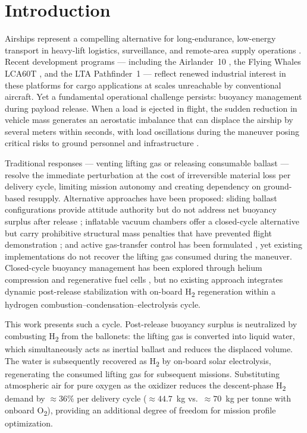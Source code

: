 \documentclass[applsci,article,submit,pdftex,moreauthors]{Definitions/mdpi}
\newcommand{\added}[1]{#1}
\begin{document}
\section{Introduction}

Airships represent a compelling alternative for long-endurance, low-energy transport in
heavy-lift logistics, surveillance, and remote-area supply operations \cite{ref1,ref2}. Recent development
programs --- including the Airlander~10 \cite{ref4}, the Flying Whales LCA60T \cite{ref5}, and the LTA
Pathfinder~1 \cite{ref6} --- reflect renewed industrial interest in these platforms for cargo applications
at scales unreachable by conventional aircraft. Yet a fundamental operational challenge persists:
buoyancy management during payload release. When a load is ejected in flight, the sudden
reduction in vehicle mass generates an aerostatic imbalance that can displace the airship by
several meters within seconds, with load oscillations during the maneuver posing critical risks
to ground personnel and infrastructure \cite{BenAbdallah2019}.

\added{Traditional responses --- venting lifting gas or releasing consumable ballast --- resolve
the immediate perturbation at the cost of irreversible material loss per delivery cycle, limiting
mission autonomy and creating dependency on ground-based resupply. Alternative approaches have
been proposed: sliding ballast configurations provide attitude authority but do not address net
buoyancy surplus after release \cite{Lanteigne2017}; inflatable vacuum chambers offer a closed-cycle
alternative but carry prohibitive structural mass penalties that have prevented flight demonstration
\cite{Barton2013}; and active gas-transfer control has been formulated \cite{ref2,Li2007}, yet existing
implementations do not recover the lifting gas consumed during the maneuver. Closed-cycle buoyancy
management has been explored through helium compression \cite{Pasternak2015} and regenerative fuel
cells \cite{Sun2024}, but no existing approach integrates dynamic post-release stabilization with
on-board H\textsubscript{2} regeneration within a hydrogen combustion--condensation--electrolysis cycle.}

\added{This work presents such a cycle. Post-release buoyancy surplus is neutralized by combusting
H\textsubscript{2} from the ballonets: the lifting gas is converted into liquid water, which
simultaneously acts as inertial ballast and reduces the displaced volume. The water is subsequently
recovered as H\textsubscript{2} by on-board solar electrolysis, regenerating the consumed lifting gas for subsequent missions. Substituting atmospheric air for pure oxygen as the oxidizer reduces the
descent-phase H\textsubscript{2} demand by ${\approx}36\%$ per delivery cycle (${\approx}44.7$~kg vs.\ ${\approx}70$~kg per tonne with onboard O\textsubscript{2}), providing an
additional degree of freedom for mission profile optimization.}
\end{document}
